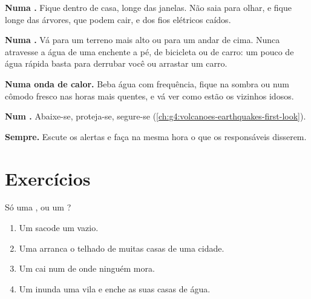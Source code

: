 \begin{safety}
\textbf{Numa .} Fique dentro de casa, longe das janelas. Não saia
para olhar, e fique longe das árvores, que podem cair, e dos fios
elétricos caídos.

\textbf{Numa .} Vá para um terreno mais alto ou para um andar de
cima. Nunca atravesse a água de uma enchente a pé, de bicicleta ou de
carro: um pouco de água rápida basta para derrubar você ou arrastar um
carro.

\textbf{Numa onda de calor.} Beba água com frequência, fique na sombra ou
num cômodo fresco nas horas mais quentes, e vá ver como estão os vizinhos
idosos.

\textbf{Num .} Abaixe-se, proteja-se, segure-se
(\cref{ch:g4:volcanoes-earthquakes-first-look}).

\textbf{Sempre.} Escute os alertas e faça na mesma hora o que os
responsáveis disserem.
\end{safety}

\section{Exercícios}

\begin{exercise}[$\star$]\label{exo:g5:natural-hazards:1}
Só uma , ou um ?
\begin{enumerate}
  \item[(a)] Um  sacode um  vazio.
  \item[(b)] Uma  arranca o telhado de muitas casas de uma cidade.
  \item[(c)] Um  cai num  de  onde ninguém mora.
  \item[(d)] Um  inunda uma vila e enche as suas casas de água.
\end{enumerate}
\end{exercise}

